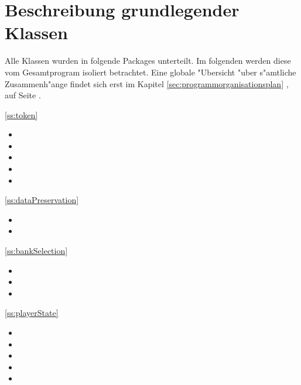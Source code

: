 \section{Beschreibung grundlegender Klassen}
Alle Klassen wurden in folgende Packages unterteilt. Im folgenden werden diese vom Gesamtprogram isoliert betrachtet. Eine globale "Ubersicht "uber s"amtliche Zusammenh"ange findet sich erst im Kapitel \ref{sec:programmorganisationsplan} , auf Seite \pageref{sec:programmorganisationsplan}. 

\begin{multicols}{2}
\begin{itemize}

	\item \ref{ss:token} 
	\begin{itemize}
		\item {}
		\item {}
		\item {}
		\item {}
		\item {}
	\end{itemize}
	\item \ref{ss:dataPreservation} 
	\begin{itemize}
		\item {}
		\item {}
	\end{itemize}
	\item \ref{ss:bankSelection} 
	\begin{itemize}
		\item {}
		\item {}
		\item {}
	\end{itemize}
	\begin{minipage}{\linewidth}
	\item \ref{ss:playerState} 
	\begin{itemize}
		\item {}
		\item {}
		\item {}
		\item {}		
		\item {}	

\end{itemize}
\end{minipage}
\end{itemize}
\end{multicols}
